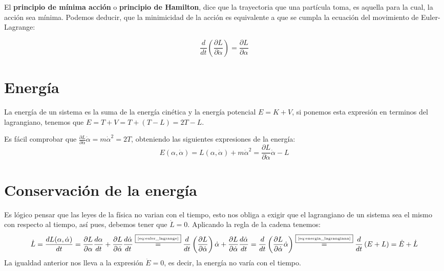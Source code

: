 El \textbf{principio de mínima acción} o \textbf{principio de Hamilton}, dice que la trayectoria que una partícula toma, es aquella para la cual, la acción sea mínima.
Podemos deducir, que la minimicidad de la acción es equivalente a que se cumpla la ecuación del movimiento de Euler-Lagrange:
\begin{postulate}
    \begin{equation}
        \label{eq:euler_lagrange}
        \frac{d}{dt}\left(\frac{\partial L}{\partial \dot{\alpha}}\right)=\frac{\partial L}{\partial \alpha}
    \end{equation}
\end{postulate}


\section{Energía}
La energía de un sistema es la suma de la energía cinética y la energía potencial $E=K+V$, si ponemos esta expresión en terminos del lagrangiano, tenemos que $E=T+V=T+(T-L)=2T-L$.

Es fácil comprobar que $\frac{\partial L}{\partial\dot{\alpha}}\dot{\alpha}=m\dot{\alpha}^2=2T$, obteniendo las siguientes expresiones de la energía:
\begin{equation}
    \label{eq:energia_lagrangiana}
    E(\alpha, \dot{\alpha})=L(\alpha, \dot{\alpha})+m\dot{\alpha}^2=\frac{\partial L}{\partial\dot{\alpha}}\dot{\alpha}-L
\end{equation}


\section{Conservación de la energía}
Es lógico pensar que las leyes de la física no varian con el tiempo, esto nos obliga a exigir que el lagrangiano de un sistema sea el mismo con respecto al tiempo, así pues, debemos tener que $\dot{L}=0$.
Aplicando la regla de la cadena tenemos:
\begin{equation*}
    \dot{L}=\frac{dL(\alpha, \dot{\alpha})}{dt}=\frac{\partial L}{\partial \alpha}\frac{d\alpha}{dt}+\frac{\partial L}{\partial \dot{\alpha}}\frac{d\dot{\alpha}}{dt}\overset{\fbox{\tiny \ref{eq:euler_lagrange}}}{=}\frac{d}{dt}\left(\frac{\partial L}{\partial \dot{\alpha}}\right)\dot{\alpha}+\frac{\partial L}{\partial \dot{\alpha}}\frac{d\dot{\alpha}}{dt}=\frac{d}{dt}\left(\frac{\partial L}{\partial \dot{\alpha}}\dot{\alpha}\right)\overset{\fbox{\tiny \ref{eq:energia_lagrangiana}}}{=}\frac{d}{dt}\left(E+L\right)=\dot{E}+\dot{L}
\end{equation*}
La igualdad anterior nos lleva a la expresión $\dot{E}=0$, es decir, la energía no varía con el tiempo.


